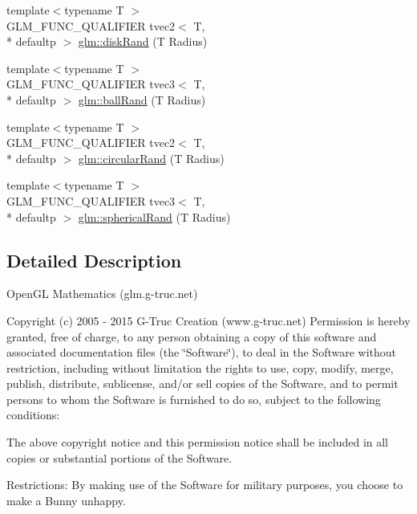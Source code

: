 \begin{DoxyCompactItemize}
\item 
{\footnotesize template$<$typename T $>$ }\\G\-L\-M\-\_\-\-F\-U\-N\-C\-\_\-\-Q\-U\-A\-L\-I\-F\-I\-E\-R tvec2$<$ T, \\*
defaultp $>$ \hyperlink{group__gtc__random_gad3a3ee7d26502a31ba552cb627a68606}{glm\-::disk\-Rand} (T Radius)
\item 
{\footnotesize template$<$typename T $>$ }\\G\-L\-M\-\_\-\-F\-U\-N\-C\-\_\-\-Q\-U\-A\-L\-I\-F\-I\-E\-R tvec3$<$ T, \\*
defaultp $>$ \hyperlink{group__gtc__random_ga5506dee301160e3a06aef9b9bc7a0a83}{glm\-::ball\-Rand} (T Radius)
\item 
{\footnotesize template$<$typename T $>$ }\\G\-L\-M\-\_\-\-F\-U\-N\-C\-\_\-\-Q\-U\-A\-L\-I\-F\-I\-E\-R tvec2$<$ T, \\*
defaultp $>$ \hyperlink{group__gtc__random_gae989c26a2899b2fb7444abe7c275c29c}{glm\-::circular\-Rand} (T Radius)
\item 
{\footnotesize template$<$typename T $>$ }\\G\-L\-M\-\_\-\-F\-U\-N\-C\-\_\-\-Q\-U\-A\-L\-I\-F\-I\-E\-R tvec3$<$ T, \\*
defaultp $>$ \hyperlink{group__gtc__random_gaa9a6fc2d7a295b3857f7db23b1053d9d}{glm\-::spherical\-Rand} (T Radius)
\end{DoxyCompactItemize}


\subsection{Detailed Description}
Open\-G\-L Mathematics (glm.\-g-\/truc.\-net)

Copyright (c) 2005 -\/ 2015 G-\/\-Truc Creation (www.\-g-\/truc.\-net) Permission is hereby granted, free of charge, to any person obtaining a copy of this software and associated documentation files (the \char`\"{}\-Software\char`\"{}), to deal in the Software without restriction, including without limitation the rights to use, copy, modify, merge, publish, distribute, sublicense, and/or sell copies of the Software, and to permit persons to whom the Software is furnished to do so, subject to the following conditions\-:

The above copyright notice and this permission notice shall be included in all copies or substantial portions of the Software.

Restrictions\-: By making use of the Software for military purposes, you choose to make a Bunny unhappy.

